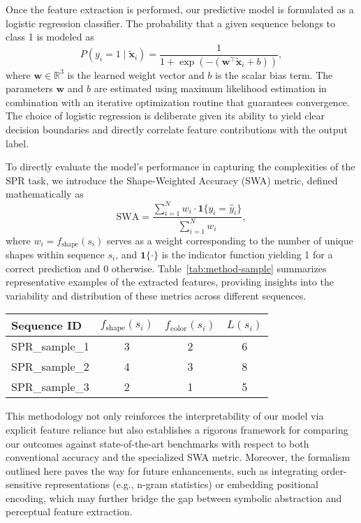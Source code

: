 \documentclass{article}
\begin{document}
Once the feature extraction is performed, our predictive model is formulated as a logistic regression classifier. The probability that a given sequence belongs to class 1 is modeled as
\[
P(y_i = 1 \mid \tilde{\mathbf{x}}_i) = \frac{1}{1 + \exp\left(-\left(\mathbf{w}^\top \tilde{\mathbf{x}}_i + b\right)\right)},
\]
where \( \mathbf{w} \in \mathbb{R}^3 \) is the learned weight vector and \( b \) is the scalar bias term. The parameters \( \mathbf{w} \) and \( b \) are estimated using maximum likelihood estimation in combination with an iterative optimization routine that guarantees convergence. The choice of logistic regression is deliberate given its ability to yield clear decision boundaries and directly correlate feature contributions with the output label.

To directly evaluate the model’s performance in capturing the complexities of the SPR task, we introduce the Shape-Weighted Accuracy (SWA) metric, defined mathematically as
\[
\text{SWA} = \frac{\sum_{i=1}^{N} w_i \cdot \mathbf{1}\{y_i = \hat{y}_i\}}{\sum_{i=1}^{N} w_i},
\]
where \( w_i = f_{\text{shape}}(s_i) \) serves as a weight corresponding to the number of unique shapes within sequence \( s_i \), and \(\mathbf{1}\{\cdot\}\) is the indicator function yielding 1 for a correct prediction and 0 otherwise. Table~\ref{tab:method-sample} summarizes representative examples of the extracted features, providing insights into the variability and distribution of these metrics across different sequences.

\begin{center}
\begin{tabular}{lccc}
\hline
\textbf{Sequence ID} & \textbf{\(f_{\text{shape}}(s_i)\)} & \textbf{\(f_{\text{color}}(s_i)\)} & \textbf{\(L(s_i)\)} \\ \hline
SPR\_sample\_1 & 3 & 2 & 6 \\
SPR\_sample\_2 & 4 & 3 & 8 \\
SPR\_sample\_3 & 2 & 1 & 5 \\ \hline
\end{tabular}
\end{center}

This methodology not only reinforces the interpretability of our model via explicit feature reliance but also establishes a rigorous framework for comparing our outcomes against state-of-the-art benchmarks with respect to both conventional accuracy and the specialized SWA metric. Moreover, the formalism outlined here paves the way for future enhancements, such as integrating order-sensitive representations (e.g., n-gram statistics) or embedding positional encoding, which may further bridge the gap between symbolic abstraction and perceptual feature extraction.
\end{document}
